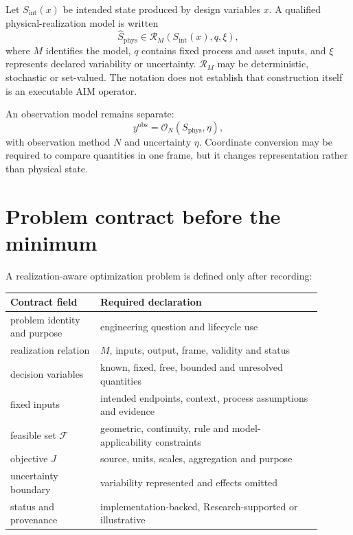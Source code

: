 Let \(S_{\mathrm{int}}(x)\) be intended state produced by design variables
\(x\). A qualified physical-realization model is written
\[
\widehat S_{\mathrm{phys}}
\in
\mathcal R_M\!\left(
S_{\mathrm{int}}(x),q,\xi
\right),
\]
where \(M\) identifies the model, \(q\) contains fixed process and asset
inputs, and \(\xi\) represents declared variability or uncertainty.
\(\mathcal R_M\) may be deterministic, stochastic or set-valued. The notation
does not establish that construction itself is an executable AIM operator.

An observation model remains separate:
\[
y^{\mathrm{obs}}
=
\mathcal O_N(S_{\mathrm{phys}},\eta),
\]
with observation method \(N\) and uncertainty \(\eta\). Coordinate conversion
may be required to compare quantities in one frame, but it changes
representation rather than physical state.

\section{Problem contract before the minimum}

A realization-aware optimization problem is defined only after recording:

\begin{center}
\small
\begin{tabular}{p{0.26\linewidth}p{0.64\linewidth}}
\toprule
Contract field & Required declaration\\
\midrule
problem identity and purpose & engineering question and lifecycle use\\
realization relation & \(M\), inputs, output, frame, validity and status\\
decision variables & known, fixed, free, bounded and unresolved quantities\\
fixed inputs & intended endpoints, context, process assumptions and evidence\\
feasible set \(\mathcal F\) & geometric, continuity, rule and model-applicability constraints\\
objective \(J\) & source, units, scales, aggregation and purpose\\
uncertainty boundary & variability represented and effects omitted\\
status and provenance & implementation-backed, Research-supported or illustrative\\
\bottomrule
\end{tabular}
\end{center}

